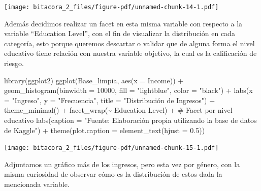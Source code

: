 \documentclass[
  letterpaper,
  DIV=11,
  numbers=noendperiod]{scrreprt}
\newenvironment{Shaded}{\begin{snugshade}}{\end{snugshade}}
\newcommand{\AttributeTok}[1]{\textcolor[rgb]{0.40,0.45,0.13}{#1}}
\newcommand{\CommentTok}[1]{\textcolor[rgb]{0.37,0.37,0.37}{#1}}
\newcommand{\DecValTok}[1]{\textcolor[rgb]{0.68,0.00,0.00}{#1}}
\newcommand{\FloatTok}[1]{\textcolor[rgb]{0.68,0.00,0.00}{#1}}
\newcommand{\FunctionTok}[1]{\textcolor[rgb]{0.28,0.35,0.67}{#1}}
\newcommand{\NormalTok}[1]{\textcolor[rgb]{0.00,0.23,0.31}{#1}}
\newcommand{\SpecialCharTok}[1]{\textcolor[rgb]{0.37,0.37,0.37}{#1}}
\newcommand{\StringTok}[1]{\textcolor[rgb]{0.13,0.47,0.30}{#1}}
\begin{document}
\texttt{[image: bitacora\_2\_files/figure-pdf/unnamed-chunk-14-1.pdf]}

Además decidimos realizar un facet en esta misma variable con respecto a
la variable ``Education Level'', con el fin de visualizar la
distribución en cada categoría, esto porque queremos descartar o validar
que de alguna forma el nivel educativo tiene relación con nuestra
variable objetivo, la cual es la calificación de riesgo.

\begin{Shaded}
\begin{Highlighting}[]
\FunctionTok{library}\NormalTok{(ggplot2)}
\FunctionTok{ggplot}\NormalTok{(Base\_limpia, }\FunctionTok{aes}\NormalTok{(}\AttributeTok{x =}\NormalTok{ Income)) }\SpecialCharTok{+} 
  \FunctionTok{geom\_histogram}\NormalTok{(}\AttributeTok{binwidth =} \DecValTok{10000}\NormalTok{, }\AttributeTok{fill =} \StringTok{"lightblue"}\NormalTok{, }\AttributeTok{color =} \StringTok{"black"}\NormalTok{) }\SpecialCharTok{+} 
  \FunctionTok{labs}\NormalTok{(}\AttributeTok{x =} \StringTok{"Ingreso"}\NormalTok{, }\AttributeTok{y =} \StringTok{"Frecuencia"}\NormalTok{, }\AttributeTok{title =} \StringTok{"Distribución de Ingresos"}\NormalTok{) }\SpecialCharTok{+} \FunctionTok{theme\_minimal}\NormalTok{() }\SpecialCharTok{+}
  \FunctionTok{facet\_wrap}\NormalTok{(}\SpecialCharTok{\textasciitilde{}} \StringTok{\textasciigrave{}}\AttributeTok{Education Level}\StringTok{\textasciigrave{}}\NormalTok{) }\SpecialCharTok{+} \CommentTok{\# Facet por nivel educativo}
  \FunctionTok{labs}\NormalTok{(}\AttributeTok{caption =} \StringTok{"Fuente: Elaboración propia utilizando la base de datos de Kaggle"}\NormalTok{) }\SpecialCharTok{+}
\FunctionTok{theme}\NormalTok{(}\AttributeTok{plot.caption =} \FunctionTok{element\_text}\NormalTok{(}\AttributeTok{hjust =} \FloatTok{0.5}\NormalTok{)) }
\end{Highlighting}
\end{Shaded}

\texttt{[image: bitacora\_2\_files/figure-pdf/unnamed-chunk-15-1.pdf]}

Adjuntamos un gráfico más de los ingresos, pero esta vez por género, con
la misma curiosidad de observar cómo es la distribución de estos dada la
mencionada variable.
\end{document}
